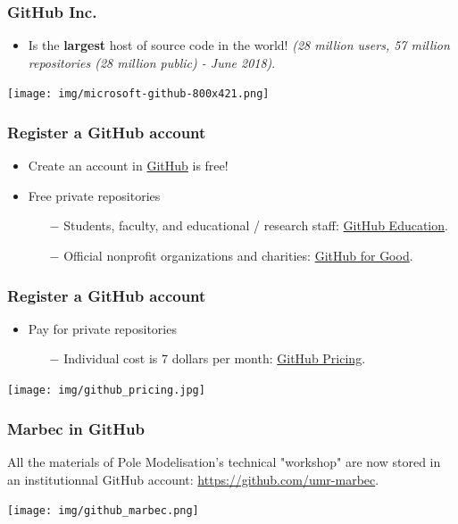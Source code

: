 \documentclass[svgnames]{beamer}
\begin{document}
\begin{frame}
\frametitle{GitHub Inc.}
\begin{itemize}
\item Is the \textbf{largest} host of source code in the world! \emph{(28 million users, 57 million repositories (28 million public) - June 2018)}.
\end{itemize}

\begin{center}
\texttt{[image: img/microsoft-github-800x421.png]}
\end{center}  

\end{frame}


\begin{frame}
\frametitle{Register a GitHub account}
  \begin{itemize}
    \item Create an account in \href{https://github.com/}{ GitHub} is free! \hfill \break
    \item Free private repositories
        \begin{itemize}
        \item[$-$] Students, faculty, and educational / research staff: \href{https://education.github.com/}{ GitHub Education}.
        \item[$-$] Official nonprofit organizations and charities: \href{https://github.com/nonprofit}{ GitHub for Good}.
       \end{itemize}
        
\end{itemize}
\end{frame}

\begin{frame}
\frametitle{Register a GitHub account}
\begin{itemize}
    \item Pay for private repositories
    \begin{itemize}
    \item[$-$] Individual cost is 7 dollars per month: \href{https://github.com/pricing}{ GitHub Pricing}.
    \end{itemize}

\end{itemize}

\begin{center}
\texttt{[image: img/github\_pricing.jpg]}
\end{center}  
\end{frame}

\begin{frame}
\frametitle{Marbec in GitHub}

    All the materials of Pole Modelisation's technical "workshop" are now stored in an institutionnal GitHub account: \url{https://github.com/umr-marbec}.

\begin{center}
\texttt{[image: img/github\_marbec.png]}
\end{center}  
\end{frame}
\end{document}
